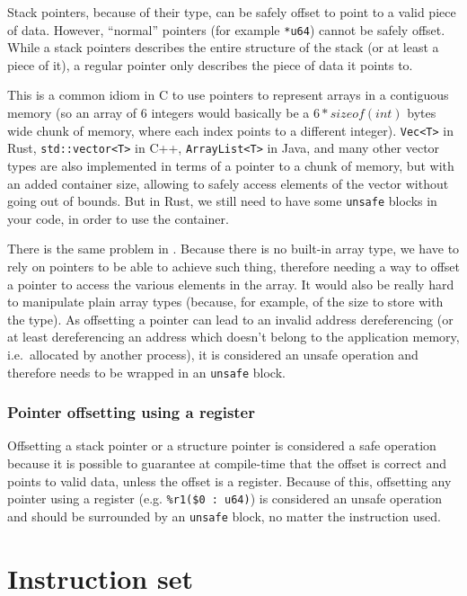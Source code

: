 Stack pointers, because of their type, can be safely offset to point to a valid piece of data.
However, ``normal'' pointers (for example \texttt{*u64}) cannot be safely offset.
While a stack pointers describes the entire structure of the stack (or at least a piece of it), a regular pointer only describes the piece of data it points to.

This is a common idiom in C to use pointers to represent arrays in a contiguous memory (so an array of 6 integers would basically be a $6 * sizeof(int)$ bytes wide chunk of memory, where each index points to a different integer).
\texttt{Vec<T>} in Rust, \texttt{std::vector<T>} in C++, \texttt{ArrayList<T>} in Java, and many other vector types are also implemented in terms of a pointer to a chunk of memory, but with an added container size, allowing to safely access elements of the vector without going out of bounds.
But in Rust, we still need to have some \texttt{unsafe} blocks in your code, in order to use the container.

There is the same problem in \nstar.
Because there is no built-in array type, we have to rely on pointers to be able to achieve such thing, therefore needing a way to offset a pointer to access the various elements in the array.
It would also be really hard to manipulate plain array types (because, for example, of the size to store with the type).
As offsetting a pointer can lead to an invalid address dereferencing (or at least dereferencing an address which doesn't belong to the application memory, i.e.\ allocated by another process), it is considered an unsafe operation and therefore needs to be wrapped in an \texttt{unsafe} block.

\subsection{Pointer offsetting using a register}\label{subsec:nstar-common-unsafe-ptroffsetreg}

Offsetting a stack pointer or a structure pointer is considered a safe operation because it is possible to guarantee at compile-time that the offset is correct and points to valid data, unless the offset is a register.
Because of this, offsetting any pointer using a register (e.g. \texttt{\%r1(\$0 : u64)}) is considered an unsafe operation and should be surrounded by an \texttt{unsafe} block, no matter the instruction used.

\chapter{Instruction set}\label{chap:nstar-instructionset}

